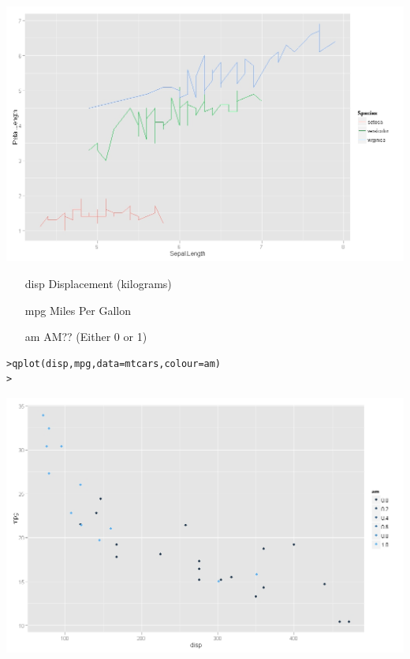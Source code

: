 \begin{frame}{\bf {}}
\vspace{-1cm}
\begin{center}
\includegraphics[scale = 0.35]{IrisPlot2}
\end{center}
\end{frame}

\begin{frame}[fragile]{\bf {}}
\begin{itemize}
\item[disp] Displacement (kilograms)
\item[mpg] Miles Per Gallon 
\item[am] AM?? (Either 0 or 1)
\end{itemize}
\begin{verbatim}
>qplot(disp,mpg,data=mtcars,colour=am)
>
\end{verbatim}
\end{frame}


\begin{frame}{\bf {}}
\vspace{-1cm}
\begin{center}
\includegraphics[scale = 0.35]{cars2}
\end{center}
\end{frame}

